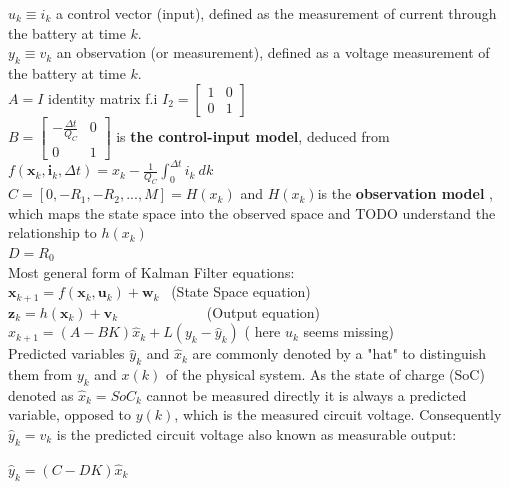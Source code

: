 $u_{k} \equiv i_{k}$ a control vector (input), defined as the measurement of current through the battery at time $k$. \\ 
$y_{k} \equiv v_{k}$ an observation (or measurement), defined as a voltage measurement of the battery at time $k$. \\
$A = I$  identity matrix f.i $I_{2}=\begin{bmatrix}1&0\\0&1\end{bmatrix}$ \\
$B = \begin{bmatrix}-\frac{\Delta t}{{Q_{C}}}&0\\0&1\end{bmatrix} $  is \textbf{the control-input model}, deduced from  $f({\boldsymbol {x}}_{k},{\boldsymbol {i}}_{k},\Delta t) =  {x}_{k} - \frac{1}{{Q_{C}}}\int_{0}^{\Delta t} {i_{k}\ dk} $ \\
$ C = [0, -R_1, -R_2, ..., M] = H(x_k) $ and $H(x_k) $is the \textbf{observation model} , which maps the state space into the observed space and TODO understand the relationship to $ h(x_k)$ \\ 
$ D = R_0 $ \\


Most general form of Kalman Filter equations: \\

$  {\boldsymbol {x}}_{k+1}=f({\boldsymbol {x}}_{k},{\boldsymbol {u}}_{k})+ {\boldsymbol {w}}_{k} $ \ (State Space equation)  \\
$  {\boldsymbol  {z}}_{{k}}=h({\boldsymbol  {x}}_{{k}})+{\boldsymbol  {v}}_{{k}} $ \ \ \ \ \ \ \ \ \ \ \  \ (Output equation)  \\


$ {\hat  {x}}_{k+1}=\left(A-BK\right){\hat  {x}}_{k}+L\left(y_{k}-{\hat  {y}}_{k}\right) $  ( here $u_{k}$ seems missing)\\

Predicted variables $ \hat{y}_{k}$ and $ \hat{x}_{k} $  are commonly denoted by a "hat" to distinguish them from  $ {y}_{k} $ and $ {x}(k) $  of the physical system. As the state of charge (SoC) denoted as $\hat{x}_{k} = SoC_{k}$  cannot be measured directly it is always a predicted variable, opposed to ${y}(k)$, which is the measured circuit voltage. Consequently $ \hat{y}_{k} = {v}_{k} $ is the predicted circuit voltage also known as measurable output: 

$ {\hat{y}}_{k}=\left(C-DK\right){\hat{x}}_{k} $ 

